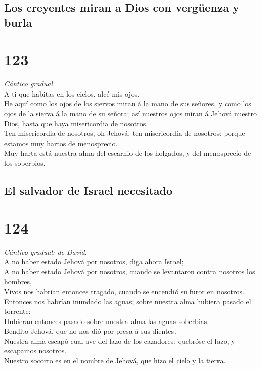 \hypertarget{los-creyentes-miran-a-dios-con-verguxfcenza-y-burla}{%
\subsection{Los creyentes miran a Dios con vergüenza y
burla}\label{los-creyentes-miran-a-dios-con-verguxfcenza-y-burla}}

\hypertarget{section-122}{%
\section{123}\label{section-122}}

 \emph{Cántico gradual.}\\
A ti que habitas en los cielos, alcé mis ojos.\\
 He aquí como los ojos de los siervos miran á la mano de sus
señores, y como los ojos de la sierva á la mano de su señora; así
nuestros ojos miran á Jehová nuestro Dios, hasta que haya misericordia
de nosotros.\\
 Ten misericordia de nosotros, oh Jehová, ten misericordia
de nosotros; porque estamos muy hartos de menosprecio.\\
 Muy harta está nuestra alma del escarnio de los holgados, y
del menosprecio de los soberbios.

\hypertarget{el-salvador-de-israel-necesitado}{%
\subsection{El salvador de Israel
necesitado}\label{el-salvador-de-israel-necesitado}}

\hypertarget{section-123}{%
\section{124}\label{section-123}}

 \emph{Cántico gradual: de David.}\\
A no haber estado Jehová por nosotros, diga ahora Israel;\\
 A no haber estado Jehová por nosotros, cuando se levantaron
contra nosotros los hombres,\\
 Vivos nos habrían entonces tragado, cuando se encendió su
furor en nosotros.\\
 Entonces nos habrían inundado las aguas; sobre nuestra alma
hubiera pasado el torrente:\\
 Hubieran entonces pasado sobre nuestra alma las aguas
soberbias.\\
 Bendito Jehová, que no nos dió por presa á sus dientes.\\
 Nuestra alma escapó cual ave del lazo de los cazadores:
quebróse el lazo, y escapamos nosotros.\\
 Nuestro socorro es en el nombre de Jehová, que hizo el
cielo y la tierra.

